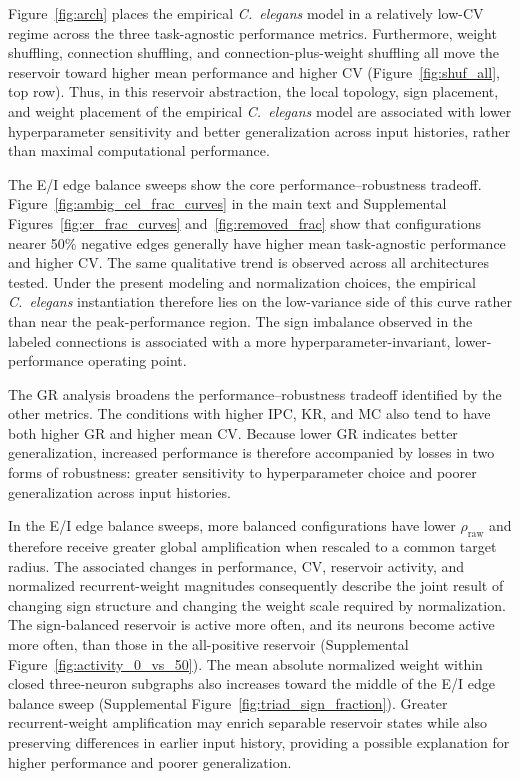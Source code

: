 \documentclass[a4paper,fleqn]{style_neural_networks/cas-dc}
\begin{document}
Figure~\ref{fig:arch} places the empirical \textit{C.\ elegans} model in a relatively low-CV regime across the three task-agnostic performance metrics. Furthermore, weight shuffling, connection shuffling, and connection-plus-weight shuffling all move the reservoir toward higher mean performance and higher CV (Figure~\ref{fig:shuf_all}, top row). Thus, in this reservoir abstraction, the local topology, sign placement, and weight placement of the empirical \textit{C.\ elegans} model are associated with lower hyperparameter sensitivity and better generalization across input histories, rather than maximal computational performance.

The E/I edge balance sweeps show the core performance--robustness tradeoff. Figure~\ref{fig:ambig_cel_frac_curves} in the main text and Supplemental Figures~\ref{fig:er_frac_curves} and~\ref{fig:removed_frac} show that configurations nearer 50\% negative edges generally have higher mean task-agnostic performance and higher CV. The same qualitative trend is observed across all architectures tested. Under the present modeling and normalization choices, the empirical \textit{C.\ elegans} instantiation therefore lies on the low-variance side of this curve rather than near the peak-performance region. The sign imbalance observed in the labeled connections is associated with a more hyperparameter-invariant, lower-performance operating point.

The GR analysis broadens the performance--robustness tradeoff identified by the other metrics. The conditions with higher IPC, KR, and MC also tend to have both higher GR and higher mean CV. Because lower GR indicates better generalization, increased performance is therefore accompanied by losses in two forms of robustness: greater sensitivity to hyperparameter choice and poorer generalization across input histories.

In the E/I edge balance sweeps, more balanced configurations have lower \(\rho_{\mathrm{raw}}\) and therefore receive greater global amplification when rescaled to a common target radius. The associated changes in performance, CV, reservoir activity, and normalized recurrent-weight magnitudes consequently describe the joint result of changing sign structure and changing the weight scale required by normalization. The sign-balanced reservoir is active more often, and its neurons become active more often, than those in the all-positive reservoir (Supplemental Figure~\ref{fig:activity_0_vs_50}). The mean absolute normalized weight within closed three-neuron subgraphs also increases toward the middle of the E/I edge balance sweep (Supplemental Figure~\ref{fig:triad_sign_fraction}). Greater recurrent-weight amplification may enrich separable reservoir states while also preserving differences in earlier input history, providing a possible explanation for higher performance and poorer generalization.
\end{document}
